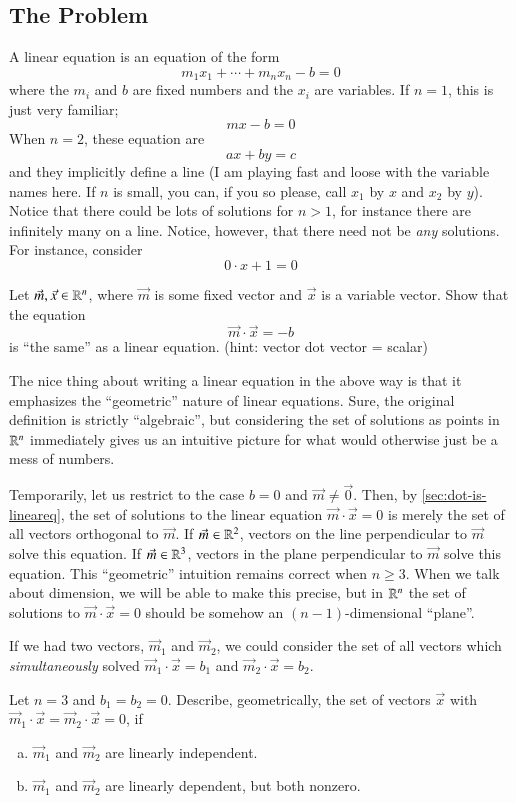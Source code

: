 \documentclass[Main.tex]{subfiles}
\begin{document}
\subsection{The Problem}

A linear equation is an equation of the form
\[m_1 x_1 + \cdots + m_n x_n - b = 0\]
where the $m_i$ and $b$ are fixed numbers and the $x_i$ are variables.  If $n=1$, this is just very familiar; 
\[mx -b = 0\]
When $n=2$, these equation are 
\[ax+by=c\]
and they implicitly define a line (I am playing fast and loose with the variable names here.  If $n$ is small, you can, if you so please, call $x_1$ by $x$ and $x_2$ by $y$).
Notice that there could be lots of solutions for $n> 1$, for instance there are infinitely many on a line.  
Notice, however, that there need not be \emph{any} solutions.  For instance, consider
\[0\cdot x + 1 = 0\]


\begin{EasyEx}
  \label{sec:dot-is-lineareq}
  Let $\vec{m},\vec{x}\in\mathbb{R}^n$, where $\vec{m}$ is some fixed vector and $\vec{x}$ is a variable vector. 
  Show that the equation
  \[\vec{m}\cdot\vec{x} = -b\]
  is ``the same'' as a linear equation.  (hint: vector dot vector = scalar)
\end{EasyEx}

\begin{Remark}
  The nice thing about writing a linear equation in the above way is that it emphasizes the ``geometric'' nature of linear equations.
  Sure, the original definition is strictly ``algebraic'', but considering the set of solutions as points in $\mathbb{R}^n$ immediately gives us an intuitive picture for what would otherwise just be a mess of numbers.  

  Temporarily, let us restrict to the case $b=0$ and $\vec{m}\ne \vec{0}$.  
  Then, by \ref{sec:dot-is-lineareq}, the set of solutions to the linear equation $\vec{m}\cdot\vec{x}=0$ is merely the set of all vectors orthogonal to $\vec{m}$.  
  If $\vec{m}\in\mathbb{R}^2$, vectors on the line perpendicular to $\vec{m}$ solve this equation.  
  If $\vec{m}\in\mathbb{R}^3$, vectors in the plane perpendicular to $\vec{m}$ solve this equation.
  This ``geometric'' intuition remains correct when $n\ge 3$.  
  When we talk about dimension, we will be able to make this precise, but in $\mathbb{R}^n$ the set of solutions to $\vec{m}\cdot\vec{x}=0$ should be somehow an $(n-1)$-dimensional ``plane''.  
\end{Remark}

If we had two vectors, $\vec{m}_1$ and $\vec{m}_2$, we could consider the set of all vectors which \emph{simultaneously} solved $\vec{m}_1\cdot\vec{x}=b_1$ and $\vec{m}_2\cdot\vec{x}=b_2$.  
\begin{Ex}
  Let $n=3$ and $b_1=b_2=0$.  Describe, geometrically, the set of vectors $\vec{x}$ with $\vec{m}_1\cdot\vec{x}=\vec{m}_2\cdot\vec{x}=0$, if  
  \begin{enumerate}[a)]
  \item $\vec{m}_1$ and $\vec{m}_2$ are linearly independent.
  \item $\vec{m}_1$ and $\vec{m}_2$ are linearly dependent, but both nonzero.  
  \end{enumerate}
\end{Ex}
\end{document}
